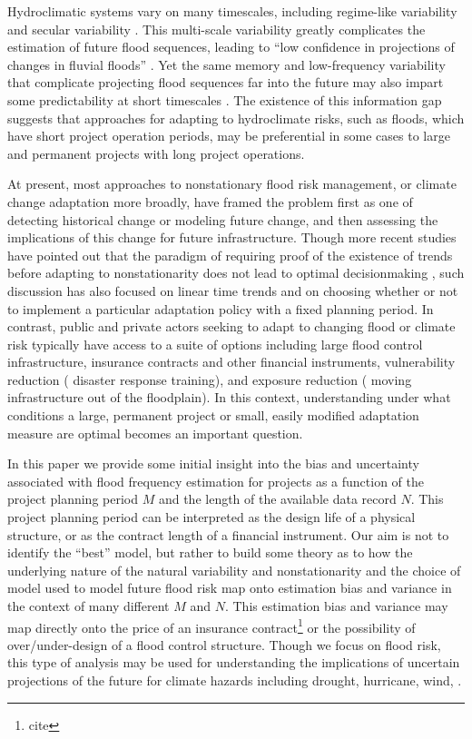 \documentclass[11pt]{article}
\begin{document}
Hydroclimatic systems vary on many timescales, including regime-like variability and secular variability  \citep{Milly2008,Merz2014,Hurst1951,Sveinsson2005,Hodgkins2017,Matalas2012}.
This multi-scale variability greatly complicates the estimation of future flood sequences, leading to ``low confidence in projections of changes in fluvial floods'' \citep{IPCC2012}.
Yet the same memory and low-frequency variability that complicate projecting flood sequences far into the future may also impart some predictability at short timescales \citep{Jain2001}.
The existence of this information gap suggests that approaches for adapting to hydroclimate risks, such as floods, which have short project operation periods, may be preferential in some cases to large and permanent projects with long project operations.

At present, most approaches to nonstationary flood risk management, or climate change adaptation more broadly, have framed the problem first as one of detecting historical change or modeling future change, and then assessing the implications of this change for future infrastructure.
Though more recent studies have pointed out that the paradigm of requiring proof of the existence of trends before adapting to nonstationarity does not lead to optimal decisionmaking \citep{Vogel2013,Rosner2014}, such discussion has also focused on linear time trends and on choosing whether or not to implement a particular adaptation policy with a fixed planning period.
In contrast, public and private actors seeking to adapt to changing flood or climate risk typically have access to a suite of options including large flood control infrastructure, insurance contracts and other financial instruments, vulnerability reduction (\ie{} disaster response training), and exposure reduction (\ie{} moving infrastructure out of the floodplain).
In this context, understanding under what conditions a large, permanent project or small, easily modified adaptation measure are optimal becomes an important question.

In this paper we provide some initial insight into the bias and uncertainty associated with flood frequency estimation for projects as a function of the project planning period \(M\) and the length of the available data record \(N\).
This project planning period can be interpreted as the design life of a physical structure, or as the contract length of a financial instrument.
Our aim is not to identify the ``best'' model, but rather to build some theory as to how the underlying nature of the natural variability and nonstationarity and the choice of model used to model future flood risk map onto estimation bias and variance in the context of many different \(M\) and \(N\).
This estimation bias and variance may map directly onto the price of an insurance contract\footnote{cite} or the possibility of over/under-design of a flood control structure.
Though we focus on flood risk, this type of analysis may be used for understanding the implications of uncertain projections of the future for climate hazards including drought, hurricane, wind, \etc{}.
\end{document}

